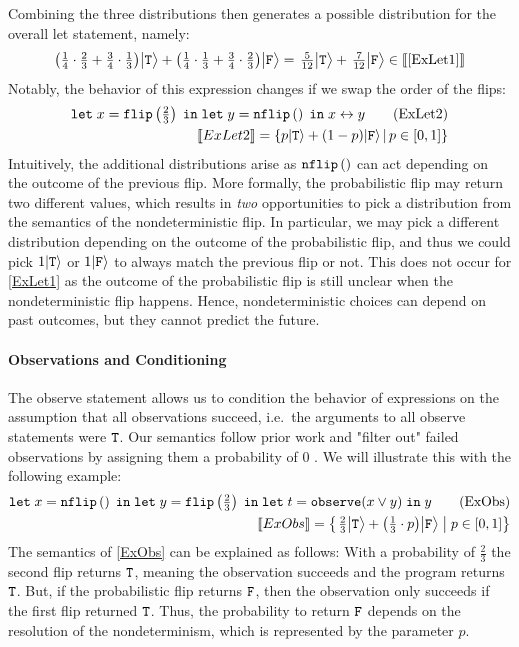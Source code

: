 Combining the three distributions then generates a possible distribution for the overall let statement, namely:
$$
\left(\tfrac{1}{4}\cdot \tfrac{2}{3} + \tfrac{3}{4}\cdot \tfrac{1}{3}\middle)\middle|\texttt{T}\right\rangle + 
\left(\tfrac{1}{4}\cdot \tfrac{1}{3} + \tfrac{3}{4}\cdot \tfrac{2}{3}\middle)\middle|\texttt{F}\right\rangle 
= \left. \tfrac{5}{12}\middle|\texttt{T}\right\rangle + \left. \tfrac{7}{12}\middle |\texttt{F} \right\rangle
\in \llbracket \text{\ref{ExLet1}} \rrbracket 
$$
%
Notably, the behavior of this expression changes if we swap the order of the flips:
%
\begin{align*}
	\texttt{let}\; x = \texttt{flip} \left(\tfrac{2}{3}\right)  \;\texttt{in}\; \texttt{let}\; y = \texttt{nflip}\left(\right)  \;\texttt{in}\; x \leftrightarrow y  \tag{ExLet2}\label{ExLet2}\\
	\llbracket ExLet2 \rrbracket = \{p | \texttt{T} \rangle + (1-p)| \texttt{F} \rangle \,|\, p \in [0,1]\}
\end{align*}
Intuitively, the additional distributions arise as $\texttt{nflip}\left(\right) $ can act depending on the outcome of the previous flip.
More formally, the probabilistic flip may return two different values, which results in \textit{two} opportunities to pick a distribution from the semantics of the nondeterministic flip.
In particular, we may pick a different distribution depending on the outcome of  the probabilistic flip, and thus we could pick $1|\texttt{T}\rangle$ or $1|\texttt{F}\rangle$ to always match the previous flip or not.
This does not occur for \ref{ExLet1} as the outcome of the probabilistic flip is still unclear when the nondeterministic flip happens.
Hence, nondeterministic choices can depend on past outcomes, but they cannot predict the future.%



\paragraph{Observations and Conditioning}
The observe statement allows us to condition the behavior of expressions on the assumption that all observations succeed, i.e.\ the arguments to all observe statements were $\texttt{T}$.
Our semantics follow prior work and "filter out" failed observations by assigning them a probability of $0$ \cite{claret2013bayesian, fierens2015inference, borgstrom2011measure, huang2016application}.
We will illustrate this with the following example:
\begin{align*}
	\texttt{let}\; x = \texttt{nflip}\left(\right)  \;\texttt{in}\; \texttt{let}\;  y = \texttt{flip} \left(\tfrac{2}{3}\right)   \;\texttt{in}\;  \texttt{let}\; t =\textnormal{\texttt{observe}} (x\lor y) \;\texttt{in}\; y  \tag{ExObs}\label{ExObs}\\
	\llbracket ExObs \rrbracket = \left\{\left. \tfrac{2}{3}\middle|\texttt{T} \right\rangle + \left(\tfrac{1}{3} \cdot p\middle)\middle|\texttt{F}\right\rangle \;\middle|\; p\in \left[0, 1\right]\right\}
\end{align*}
The semantics of \ref{ExObs} can be explained as follows: With a probability of $\frac{2}{3}$ the second flip returns $\texttt{T}$, meaning the observation succeeds and the program returns $\texttt{T}$.
But, if the probabilistic flip returns $\texttt{F}$, then the observation only succeeds if the first flip returned $\texttt{T}$.
Thus, the probability to return $\texttt{F}$ depends on the resolution of the nondeterminism, which is represented by the parameter $p$.

